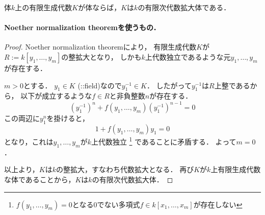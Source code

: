 
\begin{Lemma}
体$k$上の有限生成代数$K$が体ならば，$K$は$k$の有限次代数拡大体である．
\end{Lemma}

\paragraph{Noether normalization theoremを使うもの．}
\begin{proof}
    Noether normalization theoremにより，
    有限生成代数$K$が$R:=k[y_1, \dots, y_m]$の整拡大となり，
    しかも$k$上代数独立であるような元$y_1, \dots, y_m$が存在する．
    
    $m>0$とする．
    $y_1 \in K$ (::field)なので$y_1^{-1} \in K$．
    したがって$y_1^{-1}$は$R$上整であるから，
    以下が成立するような$f \in R$と非負整数$n$が存在する．
    \[ (y_1^{-1})^n+f(y_1, \dots, y_m) (y_1^{-1})^{n-1}=0 \]
    この両辺に$y_1^{n}$を掛けると，
    \[ 1+f(y_1, \dots, y_m) y_1=0 \]
    となり，これは$y_1, \dots, y_m$が$k$上代数独立
    \footnote{$f(y_1, \dots, y_m)=0$となる0でない多項式$f \in k[x_1, \dots, x_m]$が存在しない} 
    であることに矛盾する．
    よって$m=0$．

    以上より，$K$は$k$の整拡大，すなわち代数拡大となる．
    再び$K$が$k$上有限生成代数な体であることから，$K$は$k$の有限次代数拡大体．
\end{proof}


